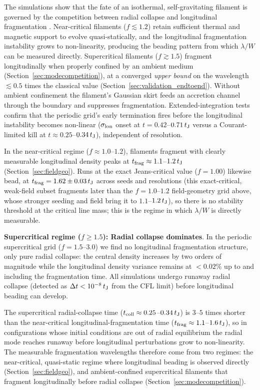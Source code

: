 \documentclass[usenatbib,twoside,twocolumn]{mnras}
\begin{document}
The simulations show that the fate of an isothermal, self-gravitating filament is governed by the competition between radial collapse and longitudinal fragmentation \citep{Inutsuka1997, Pon2012}. Near-critical filaments ($f\lesssim1.2$) retain sufficient thermal and magnetic support to evolve quasi-statically, and the longitudinal fragmentation instability grows to non-linearity, producing the beading pattern from which $\lambda/W$ can be measured directly. Supercritical filaments ($f\gtrsim1.5$) fragment longitudinally when properly confined by an ambient medium (Section~\ref{sec:modecompetition}), at a converged \emph{upper bound} on the wavelength $\lesssim0.5$ times the classical value (Section~\ref{sec:validation_endtoend}). Without ambient confinement the filament's Gaussian skirt feeds an accretion channel through the boundary and suppresses fragmentation. Extended-integration tests confirm that the periodic grid's early termination fires before the longitudinal instability becomes non-linear ($\sigma_{\rm lon}$ onset at $t=0.42$--$0.71\,t_{\rm J}$ versus a Courant-limited kill at $t\approx0.25$--$0.34\,t_{\rm J}$), independent of resolution.

In the near-critical regime ($f\approx1.0$--$1.2$), filaments fragment with clearly measurable longitudinal density peaks at $t_{\rm frag}\approx1.1$--$1.2\,t_{\rm J}$ (Section~\ref{sec:fieldgeo}). Runs at the exact Jeans-critical value ($f=1.00$) likewise bead, at $t_{\rm frag}=1.62\pm0.03\,t_{\rm J}$ across seeds and resolutions (this exact-critical, weak-field subset fragments later than the $f=1.0$--$1.2$ field-geometry grid above, whose stronger seeding and field bring it to $1.1$--$1.2\,t_{\rm J}$), so there is no stability threshold at the critical line mass; this is the regime in which $\lambda/W$ is directly measurable.

\textbf{Supercritical regime ($f \geq 1.5$): Radial collapse dominates}. In the periodic supercritical grid ($f=1.5$--$3.0$) we find no longitudinal fragmentation structure, only pure radial collapse: the central density increases by two orders of magnitude while the longitudinal density variance remains at $<0.02\%$ up to and including the fragmentation time. All simulations undergo runaway radial collapse (detected as $\Delta t < 10^{-8}\,t_{\rm J}$ from the CFL limit) before longitudinal beading can develop.

The supercritical radial-collapse time ($t_{\rm coll}\approx0.25$--$0.34\,t_{\rm J}$) is $3$--$5$ times shorter than the near-critical longitudinal-fragmentation time ($t_{\rm frag}\approx1.1$--$1.6\,t_{\rm J}$), so in configurations whose initial conditions are out of radial equilibrium the radial mode reaches runaway before longitudinal perturbations grow to non-linearity. The measurable fragmentation wavelengths therefore come from two regimes: the near-critical, quasi-static regime where longitudinal beading is observed directly (Section~\ref{sec:fieldgeo}), and ambient-confined supercritical filaments that fragment longitudinally before radial collapse (Section~\ref{sec:modecompetition}).
\end{document}
